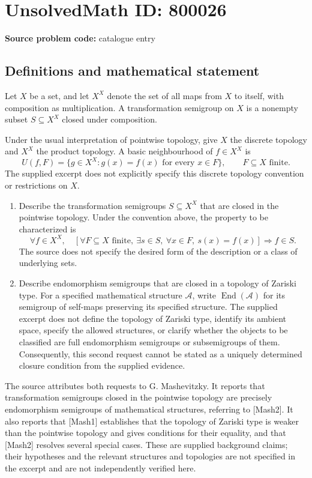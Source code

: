 \documentclass[11pt]{article}
\begin{document}
\section*{UnsolvedMath ID: 800026}
\textbf{Source problem code:} catalogue entry
\subsection{Definitions and mathematical statement}
Let \(X\) be a set, and let \(X^X\) denote the set of all maps from \(X\) to itself, with composition as multiplication. A transformation semigroup on \(X\) is a nonempty subset \(S\subseteq X^X\) closed under composition.

Under the usual interpretation of pointwise topology, give \(X\) the discrete topology and \(X^X\) the product topology. A basic neighbourhood of \(f\in X^X\) is
\[
U(f,F)=\{g\in X^X:g(x)=f(x)\text{ for every }x\in F\},
\qquad F\subseteq X\text{ finite}.
\]
The supplied excerpt does not explicitly specify this discrete topology convention or restrictions on \(X\).

\begin{enumerate}
\item Describe the transformation semigroups \(S\subseteq X^X\) that are closed in the pointwise topology. Under the convention above, the property to be characterized is
\[
\forall f\in X^X,\quad
\left[
\forall F\subseteq X\text{ finite},\ \exists s\in S,\ 
\forall x\in F,\ s(x)=f(x)
\right]
\Longrightarrow f\in S.
\]
The source does not specify the desired form of the description or a class of underlying sets.
\item Describe endomorphism semigroups that are closed in a topology of Zariski type. For a specified mathematical structure \(\mathcal A\), write \(\operatorname{End}(\mathcal A)\) for its semigroup of self-maps preserving its specified structure. The supplied excerpt does not define the topology of Zariski type, identify its ambient space, specify the allowed structures, or clarify whether the objects to be classified are full endomorphism semigroups or subsemigroups of them. Consequently, this second request cannot be stated as a uniquely determined closure condition from the supplied evidence.
\end{enumerate}

The source attributes both requests to G. Mashevitzky. It reports that transformation semigroups closed in the pointwise topology are precisely endomorphism semigroups of mathematical structures, referring to [Mash2]. It also reports that [Mash1] establishes that the topology of Zariski type is weaker than the pointwise topology and gives conditions for their equality, and that [Mash2] resolves several special cases. These are supplied background claims; their hypotheses and the relevant structures and topologies are not specified in the excerpt and are not independently verified here.
\end{document}
